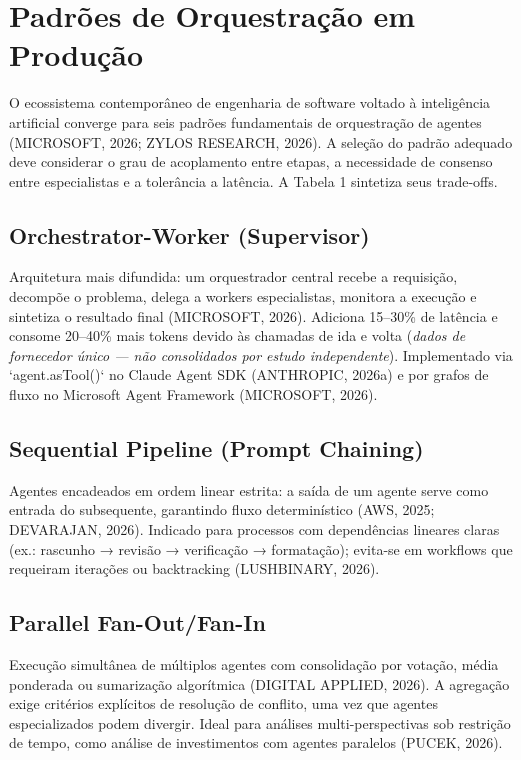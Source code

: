 \documentclass[12pt,a4paper]{article}
\begin{document}
\section{Padrões de Orquestração em Produção}

O ecossistema contemporâneo de engenharia de software voltado à inteligência artificial converge para seis padrões fundamentais de orquestração de agentes (MICROSOFT, 2026; ZYLOS RESEARCH, 2026). A seleção do padrão adequado deve considerar o grau de acoplamento entre etapas, a necessidade de consenso entre especialistas e a tolerância a latência. A Tabela 1 sintetiza seus trade-offs.

\subsection{Orchestrator-Worker (Supervisor)}

Arquitetura mais difundida: um orquestrador central recebe a requisição, decompõe o problema, delega a workers especialistas, monitora a execução e sintetiza o resultado final (MICROSOFT, 2026). Adiciona 15–30\% de latência e consome 20–40\% mais tokens devido às chamadas de ida e volta (\textit{dados de fornecedor único — não consolidados por estudo independente}). Implementado via `agent.asTool()` no Claude Agent SDK (ANTHROPIC, 2026a) e por grafos de fluxo no Microsoft Agent Framework (MICROSOFT, 2026).

\subsection{Sequential Pipeline (Prompt Chaining)}

Agentes encadeados em ordem linear estrita: a saída de um agente serve como entrada do subsequente, garantindo fluxo determinístico (AWS, 2025; DEVARAJAN, 2026). Indicado para processos com dependências lineares claras (ex.: rascunho → revisão → verificação → formatação); evita-se em workflows que requeiram iterações ou backtracking (LUSHBINARY, 2026).

\subsection{Parallel Fan-Out/Fan-In}

Execução simultânea de múltiplos agentes com consolidação por votação, média ponderada ou sumarização algorítmica (DIGITAL APPLIED, 2026). A agregação exige critérios explícitos de resolução de conflito, uma vez que agentes especializados podem divergir. Ideal para análises multi-perspectivas sob restrição de tempo, como análise de investimentos com agentes paralelos (PUCEK, 2026).
\end{document}
